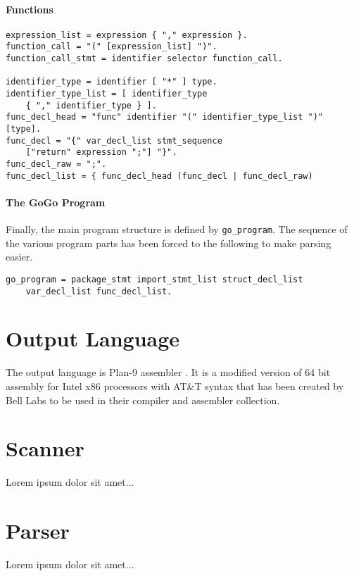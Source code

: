 \documentclass[a4paper]{scrreprt}
\begin{document}
      \subsubsection{Functions}

        \begin{lstlisting}[caption=Functions]
expression_list = expression { "," expression }.
function_call = "(" [expression_list] ")".
function_call_stmt = identifier selector function_call.

identifier_type = identifier [ "*" ] type.
identifier_type_list = [ identifier_type 
    { "," identifier_type } ].
func_decl_head = "func" identifier "(" identifier_type_list ")"  [type].
func_decl = "{" var_decl_list stmt_sequence 
    ["return" expression ";"] "}".
func_decl_raw = ";".
func_decl_list = { func_decl_head (func_decl | func_decl_raw) 
        \end{lstlisting}

      \subsubsection{The GoGo Program}
        Finally, the main program structure is defined by \texttt{go\_program}. The sequence of the various program parts has been forced to the following to make parsing easier.

        \begin{lstlisting}[caption=GoGo Program]
go_program = package_stmt import_stmt_list struct_decl_list 
    var_decl_list func_decl_list.
        \end{lstlisting}


  \chapter{Output Language}
    The output language is Plan-9 assembler \cite{pik00}. It is a modified version of 64 bit assembly for Intel x86 processors with AT\&T syntax that has been created by Bell Labs to be used in their compiler and assembler collection.

  \chapter{Scanner}
    Lorem ipsum dolor sit amet...
    
  \chapter{Parser}
    Lorem ipsum dolor sit amet...
\end{document}
